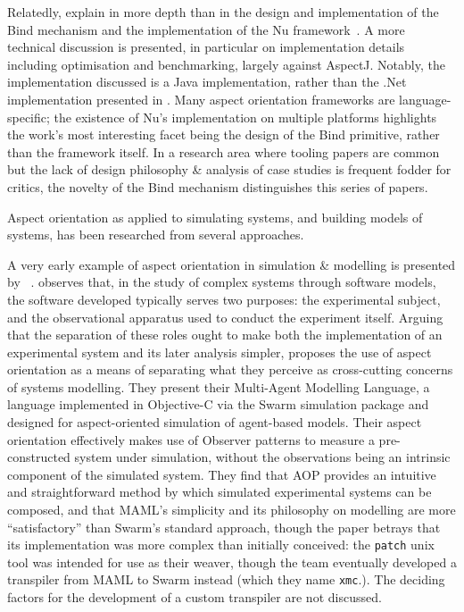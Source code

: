 Relatedly, \citeauthor{dyerNUmasters} explain in more depth than in the design
and implementation of the Bind mechanism and the implementation of the Nu
framework~\cite{dyerNUmasters}. A more technical discussion is presented, in
particular on implementation details including optimisation and benchmarking,
largely against AspectJ. Notably, the implementation discussed is a Java
implementation, rather than the .Net implementation presented in
\cite{rajan2006nu}. Many aspect orientation frameworks are language-specific;
the existence of Nu's implementation on multiple platforms highlights the work's
most interesting facet being the design of the Bind primitive, rather than the
framework itself. In a research area where tooling papers are common but the
lack of design philosophy \& analysis of case studies is frequent fodder for
critics, the novelty of the Bind mechanism distinguishes this series of papers.



Aspect orientation as applied to simulating systems, and building models of
systems, has been researched from several approaches.

A very early example of aspect orientation in simulation \& modelling is
presented by \citeauthor{gulyas1999use}~\cite{gulyas1999use}.
\citeauthor{gulyas1999use} observes that, in the study of complex systems
through software models, the software developed typically serves two purposes:
the experimental subject, and the observational apparatus used to conduct the
experiment itself. Arguing that the separation of these roles ought to make both
the implementation of an experimental system and its later analysis simpler,
\citeauthor{gulyas1999use} proposes the use of aspect orientation as a means of
separating what they perceive as cross-cutting concerns of systems modelling.
They present their Multi-Agent Modelling Language, a language implemented in
Objective-C via the Swarm simulation package and designed for aspect-oriented
simulation of agent-based models. Their aspect orientation effectively makes use
of Observer patterns to measure a pre-constructed system under simulation,
without the observations being an intrinsic component of the simulated system.
They find that AOP provides an intuitive and straightforward method by which
simulated experimental systems can be composed, and that MAML's simplicity and
its philosophy on modelling are more ``satisfactory'' than Swarm's standard
approach, though the paper betrays that its implementation was more complex than
initially conceived: the \lstinline{patch} unix tool was intended for use as
their weaver, though the team eventually developed a transpiler from MAML to
Swarm instead (which they name \lstinline{xmc}.). The deciding factors for the
development of a custom transpiler are not discussed.

